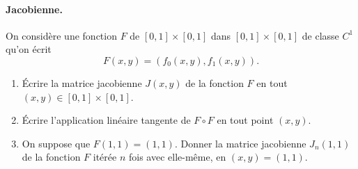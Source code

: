\paragraph{Jacobienne.}
On considère une fonction $F$ de $[0, 1] \times [0, 1]$ dans $[0, 1] \times [0, 1]$ de classe $C^1$ qu'on écrit
$$
F(x, y) = (f_0(x, y), f_1(x, y)).
$$
\begin{enumerate}
  \item \'Ecrire la matrice jacobienne $J(x, y)$ de la fonction $F$ en tout $(x, y) \in [0, 1] \times [0, 1]$.
  \solution{\todo{}}
  \item \'Ecrire l'application linéaire tangente de $F \circ F$ en tout point $(x, y)$.
  \solution{\todo{}}
  \item On suppose que $F(1, 1) = (1, 1)$. Donner la matrice jacobienne $J_n(1, 1)$ de la fonction $F$ itérée $n$ fois avec elle-même, en $(x, y) = (1, 1)$.
  \solution{\todo{}}
\end{enumerate}

